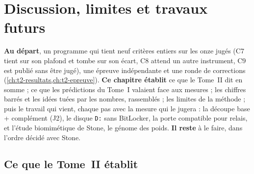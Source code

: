 \ifdefined\GrapheResVitesse\else\fi

\chapter{Discussion, limites et travaux futurs}\label{ch:t2-discussion}

\begin{origine}
\textbf{Au départ}, un programme qui tient neuf critères entiers sur les onze jugés (C7 tient sur son plafond et tombe sur son écart, C8 attend un autre instrument, C9 est publié sans être jugé), une épreuve indépendante et une ronde de corrections (\cref{ch:t2-resultats,ch:t2-epreuve}).
\textbf{Ce chapitre établit} ce que le Tome~II dit en somme ; ce que les prédictions du Tome~I valaient face aux mesures ; les chiffres barrés et les idées tuées par les nombres, rassemblés ; les limites de la méthode ; puis le travail qui vient, chaque pas avec la mesure qui le jugera : la découpe base + complément (J2), le disque \texttt{D:} sans BitLocker, la porte compatible pour relais, et l'étude biomimétique de Stone, le génome des poids.
\textbf{Il reste} à le faire, dans l'ordre décidé avec Stone.
\end{origine}

\section{Ce que le Tome~II établit}\label{t2d-sec:bilan}

